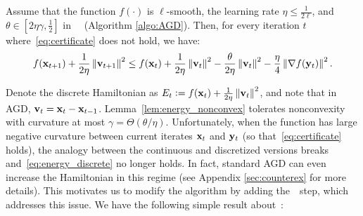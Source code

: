 \begin{lemma}\label{lem:energy_nonconvex}
  Assume that the function $f(\cdot)$ is $\ell$-smooth, the learning rate $\eta \le \frac{1}{2\ell}$, and $\theta\in [2\eta \gamma,\frac{1}{2}]$ in ~\nag~(Algorithm \ref{algo:AGD}). Then, for every iteration $t$ where~\eqref{eq:certificate} does not hold, we have:
	\vspace{-0.15cm}
  \begin{equation}\label{eq:energy_discrete}
  f(\mathbf{x}_{t+1}) + \frac{1}{2\eta}\left\|{\mathbf{v}_{t+1}}\right\|^2 \le f(\mathbf{x}_{t}) + \frac{1}{2\eta}\left\|{\mathbf{v}_{t}}\right\|^2- \frac{\theta}{2\eta}\left\|{\mathbf{v}_t}\right\|^2 - \frac{\eta}{4}\left\|{\nabla f(\mathbf{y}_{t})}\right\|^2.
  \end{equation}
\end{lemma}
\vspace{-0.2cm}
Denote the discrete Hamiltonian as $E_t \mathrel{\mathop:}= f(\mathbf{x}_{t}) + \frac{1}{2\eta}\left\|{\mathbf{v}_{t}}\right\|^2$, and note that in AGD, $\mathbf{v}_t = \mathbf{x}_{t} - \mathbf{x}_{t-1}$. Lemma~\ref{lem:energy_nonconvex} tolerates nonconvexity with curvature at most $\gamma = \Theta(\theta/\eta)$. Unfortunately, when the function has large negative curvature between current iterates $\mathbf{x}_t$ and $\mathbf{y}_t$ (so that~\eqref{eq:certificate} holds), the analogy between the continuous and discretized versions breaks and~\eqref{eq:energy_discrete} no longer holds. In fact, standard AGD can even increase the Hamiltonian in this regime (see Appendix \ref{sec:counterex} for more details).  This motivates us to modify the algorithm by adding the~\nce~step, which addresses this issue. We have the following simple result about~\nce:



